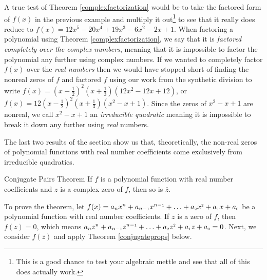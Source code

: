 A true test of Theorem \ref{complexfactorization} would be to take the factored form of $f(x)$ in the previous example and multiply it out\footnote{This is a good chance to test your algebraic mettle and see that all of this does actually work.} to see that it really does reduce to  $f(x) = 12x^5 - 20x^4+19x^3-6x^2-2x+1$.  When factoring a polynomial using Theorem \ref{complexfactorization}, we say that it is  \emph{factored completely over the complex numbers}, meaning that it is impossible to factor the polynomial any further using complex numbers.  If we wanted to   completely factor $f(x)$ over the \emph{real numbers} then we would have stopped short of finding the nonreal zeros of $f$ and factored $f$ using our work from the synthetic division to write $f(x) = \left(x - \frac{1}{2} \right)^2 \left(x + \frac{1}{3} \right)\left(12x^2 - 12x + 12\right)$, or $f(x) = 12\left(x - \frac{1}{2} \right)^2 \left(x + \frac{1}{3} \right)\left(x^2 - x + 1\right)$.  Since the zeros of $x^2-x+1$ are nonreal, we call $x^2-x+1$ an \emph{irreducible quadratic} meaning it is impossible to break it down any further using \emph{real} numbers.  


The last two results of the section show us that, theoretically, the non-real zeros of polynomial functions with real number coefficients come exclusively from irreducible quadratics.

\begin{theorem1}[conjugatepairsthm]{Conjugate Pairs Theorem} If $f$ is a polynomial function with real number coefficients and $z$ is a complex zero of $f$, then so is $\overline{z}$. 

\end{theorem1}


To prove the theorem, let 
$ f(x) = a_{n} x^{n} + a_{n-\mbox{\tiny$1$}} x^{n-\mbox{\tiny$1$}} + \ldots + a_{\mbox{\tiny $2$}} x^{\mbox{\tiny $2$}} + a_{\mbox{\tiny $1$}} x + a_{\mbox{\tiny $0$}}$ be a polynomial function with real number coefficients.  If $z$ is a zero of $f$, then $f(z) = 0$, which means $a_{n} z^{n} + a_{n-\mbox{\tiny$1$}} z^{n-\mbox{\tiny$1$}} + \ldots + a_{\mbox{\tiny $2$}} z^{\mbox{\tiny $2$}} + a_{\mbox{\tiny $1$}} z + a_{\mbox{\tiny $0$}} = 0$.  Next, we consider $f\left(\overline{z}\right)$ and apply Theorem \ref{conjugateprops} below.


